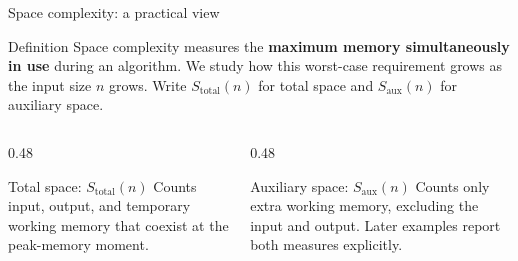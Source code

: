 \documentclass[aspectratio=169]{beamer}
\begin{document}
\begin{frame}{Space complexity: a practical view}
  \small
  \begin{block}{Definition}
    Space complexity measures the \textbf{maximum memory simultaneously in use}
    during an algorithm. We study how this worst-case requirement grows as the
    input size $n$ grows. Write $S_{\mathrm{total}}(n)$ for total space and
    $S_{\mathrm{aux}}(n)$ for auxiliary space.
  \end{block}
  \begin{center}
  \end{center}
  \vspace{0.35em}
  \begin{columns}[T]
    \begin{column}{0.48\textwidth}
      \begin{exampleblock}{Total space: $S_{\mathrm{total}}(n)$}
        Counts input, output, and temporary working memory that coexist at the
        peak-memory moment.
      \end{exampleblock}
    \end{column}
    \begin{column}{0.48\textwidth}
      \begin{alertblock}{Auxiliary space: $S_{\mathrm{aux}}(n)$}
        Counts only extra working memory, excluding the input and output. Later
        examples report both measures explicitly.
      \end{alertblock}
    \end{column}
  \end{columns}
\end{frame}
\end{document}
